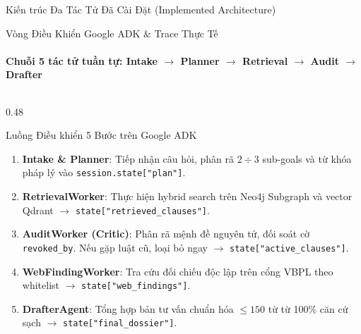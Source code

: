 \documentclass[aspectratio=169,10pt,xcolor={table}]{beamer}
\begin{document}
\begin{frame}[shrink=4]{Kiến trúc Đa Tác Tử Đã Cài Đặt (Implemented Architecture)}
\end{frame}

\begin{frame}[fragile]{Vòng Điều Khiển Google ADK \& Trace Thực Tế}
\framesubtitle{Chuỗi 5 tác tử tuần tự: Intake $\to$ Planner $\to$ Retrieval $\to$ Audit $\to$ Drafter}
\begin{columns}[T]
\begin{column}{0.48\textwidth}
\begin{block}{\small Luồng Điều khiển 5 Bước trên Google ADK}
\scriptsize
\begin{enumerate}
  \item \textbf{Intake \& Planner}: Tiếp nhận câu hỏi, phân rã $2\div 3$ sub-goals và từ khóa pháp lý vào \texttt{session.state["plan"]}.
  \item \textbf{RetrievalWorker}: Thực hiện hybrid search trên Neo4j Subgraph và vector Qdrant $\to$ \texttt{state["retrieved\_clauses"]}.
  \item \textbf{AuditWorker (Critic)}: Phân rã mệnh đề nguyên tử, đối soát cờ \texttt{revoked\_by}. Nếu gặp luật cũ, loại bỏ ngay $\to$ \texttt{state["active\_clauses"]}.
  \item \textbf{WebFindingWorker}: Tra cứu đối chiếu độc lập trên cổng VBPL theo whitelist $\to$ \texttt{state["web\_findings"]}.
  \item \textbf{DrafterAgent}: Tổng hợp bản tư vấn chuẩn hóa $\le 150$ từ từ 100\% căn cứ sạch $\to$ \texttt{state["final\_dossier"]}.
\end{enumerate}
\end{block}
\end{column}


\end{columns}
\end{frame}
\end{document}
